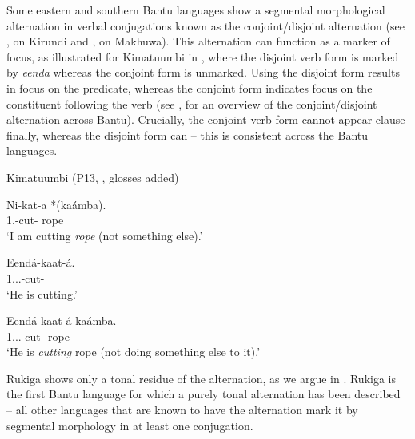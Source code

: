 \documentclass[output=paper]{langscibook}
\begin{document}
Some eastern and southern Bantu languages show a segmental morphological alternation in verbal conjugations known as the conjoint\slash disjoint alternation (see , \cite{chapters/kirundi} on Kirundi and , \cite{chapters/makhuwa} on Makhuwa). This alternation can function as a marker of focus, as illustrated for Kimatuumbi in , where the disjoint verb form is marked by \textit{eenda} whereas the conjoint form is unmarked. Using the disjoint form results in focus on the predicate, whereas the conjoint form indicates focus on the constituent following the verb (see \citealt{vanderWal2017, vanderWalFut}, for an overview of the conjoint/disjoint alternation across Bantu). Crucially, the conjoint verb form cannot appear clause-finally, whereas the disjoint form can – this is consistent across the Bantu languages.

\ea
\label{bkm:Ref135644345}Kimatuumbi (P13, \citealt[60--61]{Odden1996}, glosses added)
\ea
\begin{xlist}
\exi{\CJ{}}
\gll
Ni-kat-a  *(kaámba).\\
1\SG{}.\SM{}-cut-\FV{}  rope\\
\glt
‘I am cutting \textit{rope} (not something else).’\\
\end{xlist}


\ex
\begin{xlist}
\exi{\DJ{}}
\gll
Eendá-kaat-á.\\
1\SG{}.\SM{}.\PROG{}.\DJ{}-cut-\FV{}\\
\glt
‘He is cutting.’\\
\end{xlist}


\ex
\begin{xlist}
\exi{\DJ{}}
\gll
Eendá-kaat-á  kaámba.\\
1\SG{}.\SM{}.\PROG{}.\DJ{}-cut-\FV{}  rope\\
\glt
‘He is \textit{cutting} rope (not doing something else to it).’\\
\end{xlist}


\z
\z

Rukiga shows only a tonal residue of the alternation, as we argue in \citet{vanderWalAsiimwe2020}. Rukiga is the first Bantu language for which a purely tonal alternation has been described – all other languages that are known to have the alternation mark it by segmental morphology in at least one conjugation. 
\end{document}
